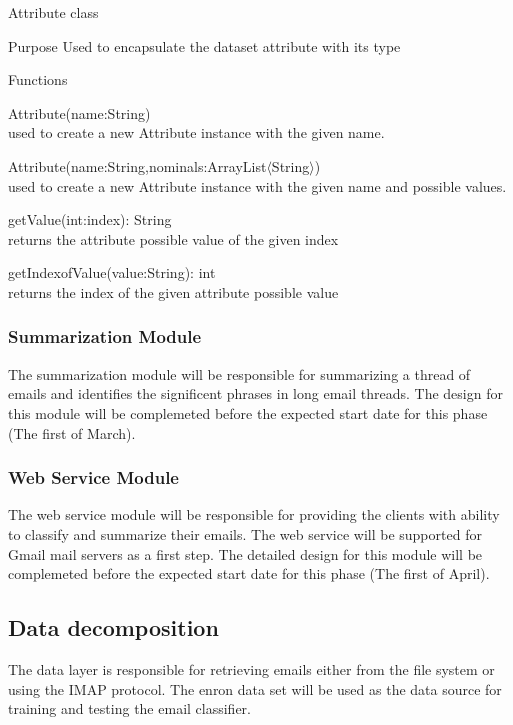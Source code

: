 \documentclass[12pt]{article}
\newenvironment{my_itemize}
{\begin{itemize}
  \setlength{\itemsep}{0cm}
  \setlength{\parskip}{0cm}}
{\end{itemize}}
\newenvironment{my_desc}
{\begin{description}
  \setlength{\itemsep}{0cm}
  \setlength{\parskip}{0cm}}
{\end{description}}
\begin{document}
\begin{my_itemize}
  \item Attribute class
  \begin{my_desc}
    \item[Purpose] Used to encapsulate the dataset attribute with its type
    \item[Functions] \hfill
    \begin{my_itemize}
      \item Attribute(name:String) \\
      used to create a new Attribute instance with the given name.
      \item Attribute(name:String,nominals:ArrayList$\langle$String$\rangle$) \\
      used to create a new Attribute instance with the given name and possible values.
      \item getValue(int:index): String \\
      returns the attribute possible value of the given index
      \item getIndexofValue(value:String): int \\
      returns the index of the given attribute possible value
    \end{my_itemize}

  \end{my_desc}

\end{my_itemize}

\subsubsection{Summarization Module}
The summarization module will be responsible for summarizing a thread of emails and identifies the significent phrases in long email threads. The design for this module will be complemeted before the expected start date for this phase (The first of March).

\subsubsection{Web Service Module}
The web service module will be responsible for providing the clients with ability to classify and summarize their emails. The web service will be supported for Gmail mail servers as a first step. The detailed design for this module will be complemeted before the expected start date for this phase (The first of April).

\subsection{Data decomposition}
The data layer is responsible for retrieving emails either from the file system or using the IMAP protocol. The enron data set will be used as the data source for training and testing the email classifier.
\end{document}
